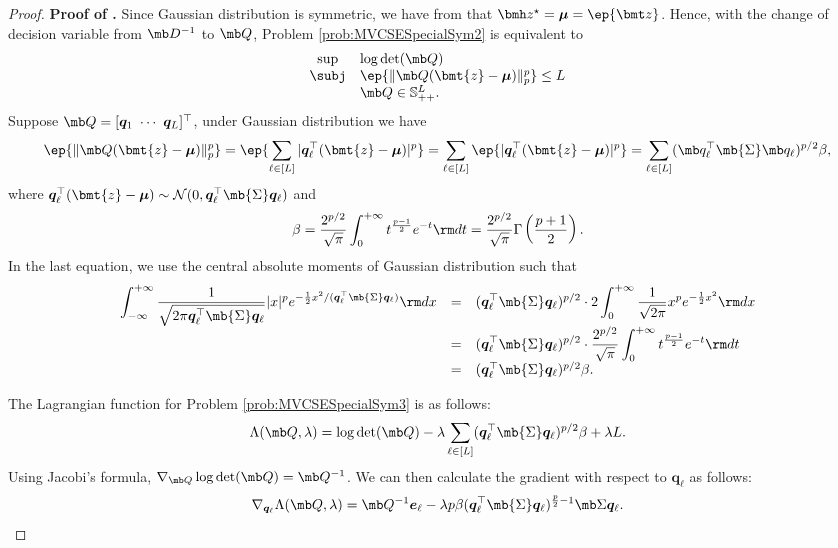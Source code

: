 \documentclass[mnsc, nonblindrev]{informswp}
\newcommand{\1}[1]{\mathds{1}{\left(#1\right)}}
\begin{document}
\begin{appendices}
\begin{proof}{\bf Proof of .}
Since Gaussian distribution is symmetric, we have from  that $\bmh z^\star = \bm \mu = \ep{\bmt z}$. Hence, with the change of decision variable from $\mb D^{-1}$ to $\mb Q$, Problem \eqref{prob:MVCSESpecialSym2} is equivalent to
\begin{equation}
\label{prob:MVCSESpecialSym3}
\begin{array}{cll}
\sup & \log\det({\mb Q}) \\
\subj & \ep{\|\mb Q ( \bmt{z} - \bm{\mu})\|_p^p} \leq L \\
& \mb Q \in \mathbb{S}^L_{++}.
\end{array}  
\end{equation}
Suppose $\mb Q = [ \bm q_1 ~\cdots~ \bm q_L]^\top$, under Gaussian distribution we have
\[
\ep{\|\mb Q (\bmt{z} - \bm \mu)\|_p^p} = \ep{\sum_{\ell \in [L]} | \bm q_{\ell}^\top (\bmt{z} - \bm \mu)|^p} = \sum_{\ell \in [L]} \ep{|\bm q_\ell^\top (\bmt{z} - \bm \mu)|^p}  = \sum_{\ell \in [L]} (\mb q_\ell^\top \mb{\Sigma} \mb q_\ell)^{p/2} \beta,
\]
where $\bm q_\ell^\top ( \bmt{z} - \bm \mu ) \sim \mathcal{N}(0, \bm q_\ell^\top \mb{\Sigma} \bm q_\ell)$ and
$$
\beta = \frac{2^{p/2}}{\sqrt{\pi}} \int_{0}^{+\infty} t^{\frac{p-1}{2}} e^{- t} {\rm d}t = \frac{2^{p/2}}{\sqrt{\pi}} \Gamma \left( \frac{p+1}{2} \right).
$$
In the last equation, we use the central absolute moments of Gaussian distribution such that
\[
\begin{array}{rcl}
\displaystyle \int_{-\infty}^{+\infty} \frac{1}{\sqrt{2 \pi \bm q_\ell^\top \mb{\Sigma} \bm q_\ell} } |x|^{p} e^{- \frac{1}{2} x^2 / (\bm q_\ell^\top \mb{\Sigma} \bm q_\ell)} {\rm d}x & = & \displaystyle (\bm q_\ell^\top \mb{\Sigma} \bm q_\ell)^{p/2} \cdot 2 \int_{0}^{+\infty} \frac{1}{\sqrt{2 \pi}} x^p e^{- \frac{1}{2} x^2} {\rm d}x \\
& = & \displaystyle (\bm q_\ell^\top \mb{\Sigma} \bm q_\ell)^{p/2} \cdot \frac{2^{p/2}}{\sqrt{\pi}} \int_{0}^{+\infty} t^{\frac{p-1}{2}} e^{- t} {\rm d}t \\
& = &  (\bm q_\ell^\top \mb{\Sigma} \bm q_\ell)^{p/2} \beta.
\end{array}
\]

The Lagrangian function for Problem \eqref{prob:MVCSESpecialSym3} is as follows:
$$
\Lambda (\mb Q, \lambda) = \log\det(\mb Q)  -\lambda \sum_{\ell \in [L]} ( \bm q_\ell^\top \mb{\Sigma} \bm q_\ell)^{p/2} \beta + \lambda L.
$$
Using Jacobi's formula, $\nabla_{\mb Q} \log\det(\mb Q) = \mb Q^{-1}$. We can then calculate the gradient with respect to $\bm q_\ell$ as follows:
\begin{equation}
\label{chap8:eq:MinimumVolumeSpecialGaussian_Grad}
\nabla_{\bm q_\ell} \Lambda (\mb Q, \lambda) = \mb Q^{-1} \bm e_{\ell}  - \lambda p \beta ( \bm q_\ell^\top \mb{\Sigma} \bm q_\ell)^{\frac{p}{2} - 1} \mb \Sigma \bm q_\ell.    
\end{equation}


\end{proof}
\end{appendices}
\end{document}
